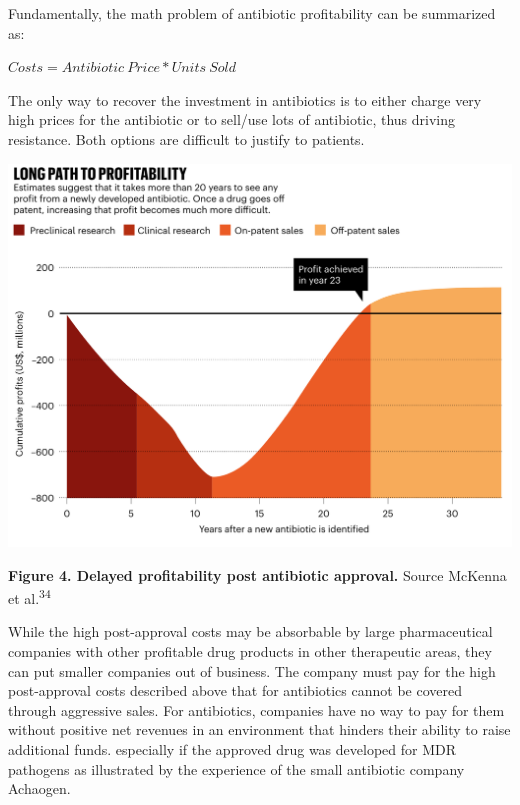 \documentclass[
  11pt,
  paper=a4,
  ,captions=tableheading
]{scrartcl}
\begin{document}
Fundamentally, the math problem of antibiotic profitability can be
summarized as:

\(Costs= Antibiotic \ Price * Units\ Sold\)

The only way to recover the investment in antibiotics is to either
charge very high prices for the antibiotic or to sell/use lots of
antibiotic, thus driving resistance. Both options are difficult to
justify to patients.

\includegraphics[width=6.25in,height=\textheight]{images/profitability.png}

\textbf{Figure 4. Delayed profitability post antibiotic approval.}
Source McKenna et al.\textsuperscript{34}

While the high post-approval costs may be absorbable by large
pharmaceutical companies with other profitable drug products in other
therapeutic areas, they can put smaller companies out of business. The
company must pay for the high post-approval costs described above that
for antibiotics cannot be covered through aggressive sales. For
antibiotics, companies have no way to pay for them without positive net
revenues in an environment that hinders their ability to raise
additional funds. especially if the approved drug was developed for MDR
pathogens as illustrated by the experience of the small antibiotic
company Achaogen.
\end{document}
